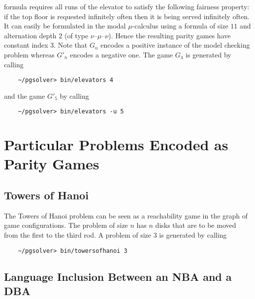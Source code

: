 formula requires all runs of the elevator to satisfy the following fairness property: if the top floor
is requested infinitely often then it is being served infinitely often. It can easily be formulated in
the modal $\mu$-calculus using a formula of size $11$ and alternation depth $2$ (of type
$\nu$--$\mu$--$\nu$). Hence the resulting parity games have constant index 3.  Note that $G_n$
encodes a positive instance of the model checking problem whereas $G'_n$ encodes a negative one.
The game $G_4$ is generated by calling
\begin{verbatim}
    ~/pgsolver> bin/elevators 4
\end{verbatim}
and the game $G'_5$ by calling
\begin{verbatim}
    ~/pgsolver> bin/elevators -u 5
\end{verbatim}


\section{Particular Problems Encoded as Parity Games}

\subsection{Towers of Hanoi}

The Towers of Hanoi problem can be seen as a reachability game in the graph of game configurations.
The problem of size $n$ has $n$ disks that are to be moved from the first to the third rod.
A problem of size $3$ is generated by calling
\begin{verbatim}
    ~/pgsolver> bin/towersofhanoi 3
\end{verbatim}


\subsection{Language Inclusion Between an NBA and a DBA}

